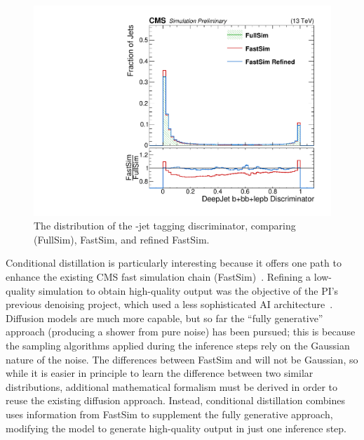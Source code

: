 \begin{figure}
\centering
\includegraphics[width=0.49\myfigurewidth]{figures/Regression_20221127_DeepFlavB_preliminary.pdf}
\caption{The distribution of the \DEEPJET \cPqb-jet tagging discriminator, comparing \GEANTfour (FullSim), FastSim, and refined FastSim.}
\label{fig:refine}
\end{figure}

Conditional distillation is particularly interesting because it offers one path to enhance the existing CMS fast simulation chain (FastSim)~\cite{Sekmen:2016iql}.
Refining a low-quality simulation to obtain high-quality output was the objective of the PI's previous denoising project, which used a less sophisticated AI architecture~\cite{Banerjee:2022gkg}.
Diffusion models are much more capable, but so far the ``fully generative'' approach (producing a shower from pure noise) has been pursued;
this is because the sampling algorithms applied during the inference steps rely on the Gaussian nature of the noise.
The differences between FastSim and \GEANTfour will not be Gaussian, so while it is easier in principle to learn the difference between two similar distributions,
additional mathematical formalism must be derived in order to reuse the existing diffusion approach.
Instead, conditional distillation combines uses information from FastSim to supplement the fully generative approach, modifying the model to generate high-quality output in just one inference step.

